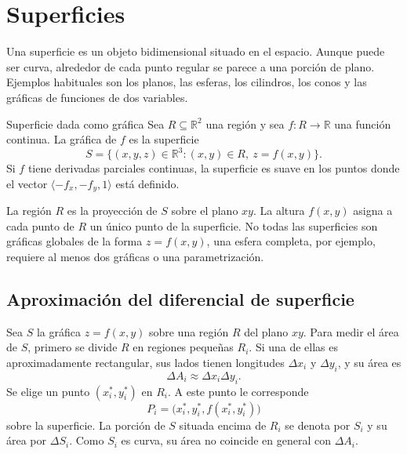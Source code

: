 \section{Superficies}

Una superficie es un objeto bidimensional situado en el espacio. Aunque puede ser curva, alrededor de cada punto regular se parece a una porción de plano. Ejemplos habituales son los planos, las esferas, los cilindros, los conos y las gráficas de funciones de dos variables.

\begin{mydefinition}{Superficie dada como gráfica}
Sea $R\subseteq\mathbb R^2$ una región y sea $f:R\to\mathbb R$ una función continua. La gráfica de $f$ es la superficie
\[
S=\{(x,y,z)\in\mathbb R^3:(x,y)\in R,\ z=f(x,y)\}.
\]
Si $f$ tiene derivadas parciales continuas, la superficie es suave en los puntos donde el vector $\langle-f_x,-f_y,1\rangle$ está definido.
\end{mydefinition}

La región $R$ es la proyección de $S$ sobre el plano $xy$. La altura $f(x,y)$ asigna a cada punto de $R$ un único punto de la superficie. No todas las superficies son gráficas globales de la forma $z=f(x,y)$, una esfera completa, por ejemplo, requiere al menos dos gráficas o una parametrización.

\subsection{Aproximación del diferencial de superficie}

Sea $S$ la gráfica $z=f(x,y)$ sobre una región $R$ del plano $xy$. Para medir el área de $S$, primero se divide $R$ en regiones pequeñas $R_i$. Si una de ellas es aproximadamente rectangular, sus lados tienen longitudes $\Delta x_i$ y $\Delta y_i$, y su área es
\[
\Delta A_i\approx\Delta x_i\Delta y_i.
\]
Se elige un punto $(x_i^*,y_i^*)$ en $R_i$. A este punto le corresponde
\[
P_i=\bigl(x_i^*,y_i^*,f(x_i^*,y_i^*)\bigr)
\]
sobre la superficie. La porción de $S$ situada encima de $R_i$ se denota por $S_i$ y su área por $\Delta S_i$. Como $S_i$ es curva, su área no coincide en general con $\Delta A_i$.


